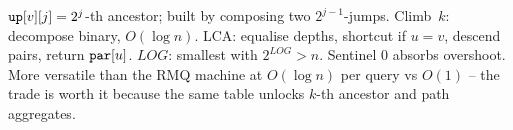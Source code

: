 \begin{recallbox}
\(\texttt{up}[v][j] = 2^j\)-th ancestor; built by composing two
\(2^{j-1}\)-jumps.  Climb~\(k\): decompose binary, \(O(\log n)\).
LCA: equalise depths, shortcut if \(u=v\), descend pairs, return
\(\texttt{par}[u]\).  \(\mathit{LOG}\): smallest with \(2^{\mathit{LOG}} > n\).  Sentinel
0 absorbs overshoot.  More versatile than the RMQ machine at
\(O(\log n)\) per query vs \(O(1)\) -- the trade is worth it because the
same table unlocks \(k\)-th ancestor and path aggregates.
\end{recallbox}
